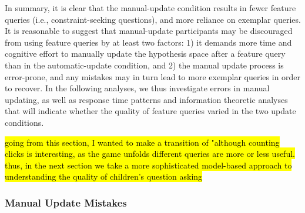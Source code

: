 \documentclass[10pt,letterpaper]{article}
\begin{document}
In summary, it is clear that the manual-update condition results in fewer feature 
queries (i.e., constraint-seeking questions), and more reliance on exemplar queries. 
It is reasonable to suggest that manual-update participants may be discouraged 
from using feature queries by at least two factors: 1) it demands more time and 
cognitive effort to manually update the hypothesis space after a feature query than 
in the automatic-update condition, and 2) the manual update process is error-prone, 
and any mistakes may in turn lead to more exemplar queries in order to recover. In 
the following analyses, we thus investigate errors in manual updating, as well as 
response time patterns and information theoretic analyses that will indicate whether 
the quality of feature queries varied in the two update conditions.

\hl{going from this section, I wanted to make a transition of "although counting
clicks is interesting, as the game unfolds different queries are more or less useful.
thus, in the next section we take a more sophisticated model-based approach to
understanding the quality of children's question asking}

  \vspace{.05cm}
  

\subsubsection{Manual Update Mistakes}
\end{document}
